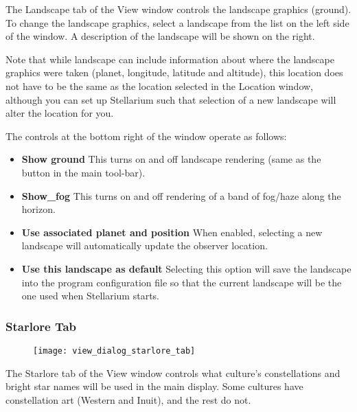 The Landscape tab of the View window controls the landscape graphics
(ground). To change the landscape graphics, select a landscape from the
list on the left side of the window. A description of the landscape will
be shown on the right.

Note that while landscape can include information about where the
landscape graphics were taken (planet, longitude, latitude and
altitude), this location does not have to be the same as the location
selected in the Location window, although you can set up Stellarium such
that selection of a new landscape will alter the location for you.

The controls at the bottom right of the window operate as follows:

\begin{itemize}
\item
  \textbf{Show ground} This turns on and off landscape rendering (same
  as the button in the main tool-bar).
\item
  \textbf{Show\_fog} This turns on and off rendering of a band of
  fog/haze along the horizon.
\item
  \textbf{Use associated planet and position} When enabled, selecting a
  new landscape will automatically update the observer location.
\item
  \textbf{Use this landscape as default} Selecting this option will save
  the landscape into the program configuration file so that the current
  landscape will be the one used when Stellarium starts.
\end{itemize}

\subsubsection{Starlore Tab}\label{starlore-tab}

\begin{figure}[h]
\centering\texttt{[image: view\_dialog\_starlore\_tab]}
\end{figure}

The Starlore tab of the View window controls what culture's
constellations and bright star names will be used in the main display.
Some cultures have constellation art (Western and Inuit), and the rest
do not.
